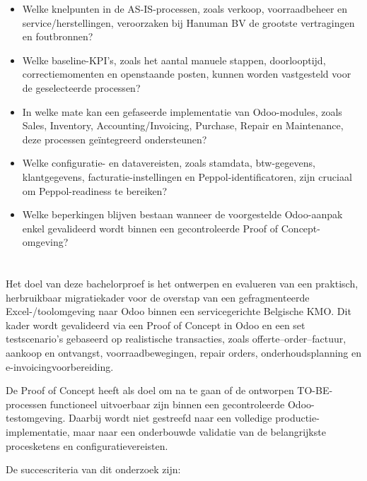 \begin{itemize}
    \item Welke knelpunten in de AS-IS-processen, zoals verkoop, voorraadbeheer en service/herstellingen, veroorzaken bij Hanuman BV de grootste vertragingen en foutbronnen?
    \item Welke baseline-KPI's, zoals het aantal manuele stappen, doorlooptijd, correctiemomenten en openstaande posten, kunnen worden vastgesteld voor de geselecteerde processen?
    \item In welke mate kan een gefaseerde implementatie van Odoo-modules, zoals Sales, Inventory, Accounting/Invoicing, Purchase, Repair en Maintenance, deze processen geïntegreerd ondersteunen?
    \item Welke configuratie- en datavereisten, zoals stamdata, btw-gegevens, klantgegevens, facturatie-instellingen en Peppol-identificatoren, zijn cruciaal om Peppol-readiness te bereiken?
    \item Welke beperkingen blijven bestaan wanneer de voorgestelde Odoo-aanpak enkel gevalideerd wordt binnen een gecontroleerde Proof of Concept-omgeving?
\end{itemize}

\section{}%
\label{sec:onderzoeksdoelstelling}

Het doel van deze bachelorproef is het ontwerpen en evalueren van een praktisch, herbruikbaar migratiekader voor de overstap van een gefragmenteerde Excel-/toolomgeving naar Odoo binnen een servicegerichte Belgische KMO. Dit kader wordt gevalideerd via een Proof of Concept in Odoo en een set testscenario's gebaseerd op realistische transacties, zoals offerte--order--factuur, aankoop en ontvangst, voorraadbewegingen, repair orders, onderhoudsplanning en e-invoicingvoorbereiding.

De Proof of Concept heeft als doel om na te gaan of de ontworpen TO-BE-processen functioneel uitvoerbaar zijn binnen een gecontroleerde Odoo-testomgeving. Daarbij wordt niet gestreefd naar een volledige productie-implementatie, maar naar een onderbouwde validatie van de belangrijkste procesketens en configuratievereisten.

De succescriteria van dit onderzoek zijn:

